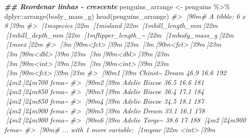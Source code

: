 \documentclass[
]{book}
\newenvironment{Shaded}{\begin{snugshade}}{\end{snugshade}}
\newcommand{\CommentTok}[1]{\textcolor[rgb]{0.37,0.37,0.37}{\textit{#1}}}
\newcommand{\DocumentationTok}[1]{\textcolor[rgb]{0.37,0.37,0.37}{\textbf{\textit{#1}}}}
\newcommand{\FunctionTok}[1]{\textcolor[rgb]{0,0,0}{#1}}
\newcommand{\NormalTok}[1]{#1}
\newcommand{\OtherTok}[1]{\textcolor[rgb]{0.37,0.37,0.37}{#1}}
\newcommand{\SpecialCharTok}[1]{\textcolor[rgb]{0,0,0}{#1}}
\begin{document}
\begin{Shaded}
\begin{Highlighting}[]
\DocumentationTok{\#\# Reordenar linhas {-} crescente}
\NormalTok{penguins\_arrange }\OtherTok{\textless{}{-}}\NormalTok{ penguins }\SpecialCharTok{\%\textgreater{}\%} 
\NormalTok{  dplyr}\SpecialCharTok{::}\FunctionTok{arrange}\NormalTok{(body\_mass\_g)}
\FunctionTok{head}\NormalTok{(penguins\_arrange)}
\CommentTok{\#\textgreater{} [90m\# A tibble: 6 x 8[39m}
\CommentTok{\#\textgreater{}   [1mspecies[22m [1misland[22m [1mbill\_length\_mm[22m [1mbill\_depth\_mm[22m [1mflipper\_length\_\textasciitilde{}[22m [1mbody\_mass\_g[22m [1msex[22m  }
\CommentTok{\#\textgreater{}   [3m[90m\textless{}fct\textgreater{}[39m[23m   [3m[90m\textless{}fct\textgreater{}[39m[23m           [3m[90m\textless{}dbl\textgreater{}[39m[23m         [3m[90m\textless{}dbl\textgreater{}[39m[23m            [3m[90m\textless{}int\textgreater{}[39m[23m       [3m[90m\textless{}int\textgreater{}[39m[23m [3m[90m\textless{}fct\textgreater{}[39m[23m}
\CommentTok{\#\textgreater{} [90m1[39m Chinst\textasciitilde{} Dream            46.9          16.6              192        [4m2[24m700 fema\textasciitilde{}}
\CommentTok{\#\textgreater{} [90m2[39m Adelie  Biscoe           36.5          16.6              181        [4m2[24m850 fema\textasciitilde{}}
\CommentTok{\#\textgreater{} [90m3[39m Adelie  Biscoe           36.4          17.1              184        [4m2[24m850 fema\textasciitilde{}}
\CommentTok{\#\textgreater{} [90m4[39m Adelie  Biscoe           34.5          18.1              187        [4m2[24m900 fema\textasciitilde{}}
\CommentTok{\#\textgreater{} [90m5[39m Adelie  Dream            33.1          16.1              178        [4m2[24m900 fema\textasciitilde{}}
\CommentTok{\#\textgreater{} [90m6[39m Adelie  Torge\textasciitilde{}           38.6          17                188        [4m2[24m900 fema\textasciitilde{}}
\CommentTok{\#\textgreater{} [90m\# ... with 1 more variable: [1myear[22m \textless{}int\textgreater{}[39m}


\end{Highlighting}
\end{Shaded}
\end{document}
